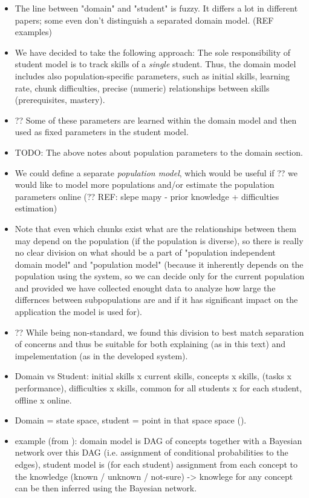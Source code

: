\begin{itemize}
\item The line between "domain" and "student" is fuzzy.
  It differs a lot in different papers; some even don't distinguish a separated
  domain model. (REF examples)
\item We have decided to take the following approach:
  The sole responsibility of student model is to track skills of a \emph{single}
  student. Thus, the domain model includes also population-specific parameters,
  such as initial skills, learning rate, chunk difficulties,
  precise (numeric) relationships between skills (prerequisites, mastery).
\item ?? Some of these parameters are learned within the domain model
  and then used as fixed parameters in the student model.
\item TODO: The above notes about population parameters to the domain section.
\item We could define a separate \emph{population model}, which would be useful
 if ?? we would like to model more populations and/or
 estimate the population parameters online
 (?? REF: slepe mapy - prior knowledge + difficulties estimation)
\item Note that even which chunks exist what are the relationships between them
  may depend on the population (if the population is diverse), so there is
  really no clear division on what should be a part of
  "population independent domain model" and "population model"
  (because it inherently depends on the population using the system,
  so we can decide only for the current population and provided we have collected
  enought data to analyze how large the differnces between subpopulations are
  and if it has significant impact on the application the model is used for).
\item ?? While being non-standard, we found this division to best match separation
  of concerns and thus be suitable for both explaining (as in this text)
  and impelementation (as in the developed system).
\item Domain vs Student:
  initial skills x current skills,
  concepts x skills,
  (tasks x performance),
  difficulties x skills,
  common for all students x for each student,
  offline x online.
\item Domain = state space, student = point in that space space
  (\cite{its-learner-models}).
\item example (from \cite{its-programming}):
  domain model is DAG of concepts together with a Bayesian network over this DAG
  (i.e. assignment of conditional probabilities to the edges),
  student model is (for each student) assignment from each concept to the
  knowledge (known / unknown / not-sure) -> knowlege for any concept can be
  then inferred using the Bayesian network.
\end{itemize}


